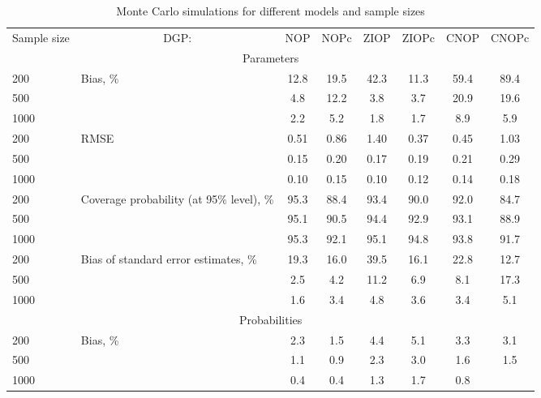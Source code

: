 \documentclass[letterpaper,fleqn,11pt]{article}
\begin{document}
\begin{onehalfspace}
\begin{table}[htbp]
\caption{Monte Carlo simulations for different models and sample sizes}
\label{table:errors}\centering
\begin{tabular}{rrcccccc}
\toprule \toprule Sample size & \multicolumn{1}{c}{DGP:} & NOP & NOPc & ZIOP
& ZIOPc & CNOP & CNOPc \\ 
\multicolumn{8}{c}{Parameters} \\ 
\multicolumn{1}{l}{200} & \multicolumn{1}{l}{\multirow{3}[1]{*}{Bias, \%}} & 
12.8 & 19.5 & 42.3 & 11.3 & 59.4 & 89.4 \\ 
\multicolumn{1}{l}{500} & \multicolumn{1}{l}{} & 4.8 & 12.2 & 3.8 & 3.7 & 
20.9 & 19.6 \\ 
\multicolumn{1}{l}{1000} & \multicolumn{1}{l}{} & 2.2 & 5.2 & 1.8 & 1.7 & 8.9
& 5.9 \\ 
\multicolumn{1}{l}{200} & \multicolumn{1}{l}{\multirow{3}[2]{*}{RMSE}} & 0.51
& 0.86 & 1.40 & 0.37 & 0.45 & 1.03 \\ 
\multicolumn{1}{l}{500} & \multicolumn{1}{l}{} & 0.15 & 0.20 & 0.17 & 0.19 & 
0.21 & 0.29 \\ 
\multicolumn{1}{l}{1000} & \multicolumn{1}{l}{} & 0.10 & 0.15 & 0.10 & 0.12
& 0.14 & 0.18 \\ 
\multicolumn{1}{l}{200} & \multicolumn{1}{l}{\multirow{3}[2]{4cm}{Coverage
probability (at 95\% level), \%}} & 95.3 & 88.4 & 93.4 & 90.0 & 92.0 & 84.7
\\ 
\multicolumn{1}{l}{500} & \multicolumn{1}{l}{} & 95.1 & 90.5 & 94.4 & 92.9 & 
93.1 & 88.9 \\ 
\multicolumn{1}{l}{1000} & \multicolumn{1}{l}{} & 95.3 & 92.1 & 95.1 & 94.8
& 93.8 & 91.7 \\ 
\multicolumn{1}{l}{200} & \multicolumn{1}{l}{\multirow{3}[2]{4cm}{Bias of
standard error estimates, \%}} & 19.3 & 16.0 & 39.5 & 16.1 & 22.8 & 12.7 \\ 
\multicolumn{1}{l}{500} & \multicolumn{1}{l}{} & 2.5 & 4.2 & 11.2 & 6.9 & 8.1
& 17.3 \\ 
\multicolumn{1}{l}{1000} & \multicolumn{1}{l}{} & 1.6 & 3.4 & 4.8 & 3.6 & 3.4
& 5.1 \\ 
\multicolumn{8}{c}{Probabilities} \\ 
\multicolumn{1}{l}{200} & \multicolumn{1}{l}{\multirow{3}[1]{*}{Bias, \%}} & 
2.3 & 1.5 & 4.4 & 5.1 & 3.3 & 3.1 \\ 
\multicolumn{1}{l}{500} & \multicolumn{1}{l}{} & 1.1 & 0.9 & 2.3 & 3.0 & 1.6
& 1.5 \\ 
\multicolumn{1}{l}{1000} & \multicolumn{1}{l}{} & 0.4 & 0.4 & 1.3 & 1.7 & 0.8

\end{tabular}
\end{table}
\end{onehalfspace}
\end{document}
